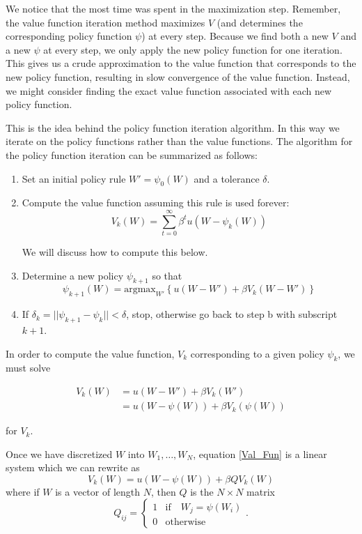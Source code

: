 We notice that the most time was spent in the maximization step.  Remember, the value function iteration method maximizes $V$ (and determines the corresponding policy function $\psi$) at every step.  Because we find both a new $V$ and a new $\psi$ at every step, we only apply the new policy function for one iteration.  This gives us a crude approximation to the value function that corresponds to the new policy function, resulting in slow convergence of the value function.  Instead, we might consider finding the exact value function associated with each new policy function.

This is the idea behind the policy function iteration algorithm.  In this way we iterate on the policy functions rather than the value functions.  The algorithm for the policy function iteration can be summarized as follows:

\begin{enumerate}
	\item Set an initial policy rule $W' = \psi_0(W)$ and a tolerance $\delta$.
	
	\item Compute the value function assuming this rule is used forever:
\begin{equation}
V_k(W) = \sum_{t=0}^\infty \beta^t u(W-\psi_k(W))
\end{equation}

    We will discuss how to compute this below.

	\item Determine a new policy $\psi_{k+1}$ so that
	\begin{equation}
		\psi_{k+1}(W) = \text{argmax}_{W'}\left\{ u(W-W') + \beta V_k(W-W') \right\}
	\end{equation}
	
	\item If $\delta_k = ||\psi_{k+1} - \psi_k|| < \delta$, stop, otherwise go back to step b with subscript $k+1$.
\end{enumerate}

In order to compute the value function, $V_k$ corresponding to a given policy $\psi_k$, we must solve

\begin{align}\label{Val_Fun}
V_k(W) &= u(W-W') + \beta V_k(W')\\
			 &= u(W-\psi(W)) + \beta V_k(\psi(W))
\end{align}

for $V_k$.

Once we have discretized $W$ into $W_1,\ldots,W_N$, equation \eqref{Val_Fun} is a linear system which we can rewrite as
\begin{equation}\label{linear}
V_k(W) = u(W-\psi(W)) + \beta QV_k(W)
\end{equation}
where if $W$ is a vector of length $N$, then $Q$ is the $N\times N$ matrix
\begin{equation}
Q_{ij} = \left\{
     \begin{array}{lr}
       1 & \text{if} \quad  W_j = \psi(W_i)\\
       0 & \text{otherwise}
     \end{array}
   \right. .
\end{equation}


